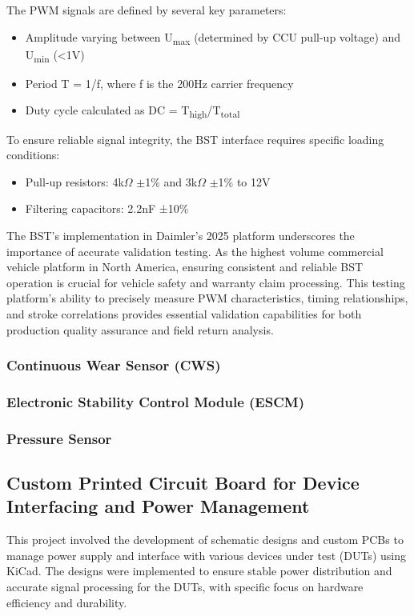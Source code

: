 \documentclass[12pt]{article}
\begin{document}
The PWM signals are defined by several key parameters: \begin{itemize} \item
    Amplitude varying between U\textsubscript{max} (determined by CCU pull-up
  voltage) and U\textsubscript{min} (<1V) \item Period T = 1/f, where f is the
    200Hz carrier frequency \item Duty cycle calculated as DC =
T\textsubscript{high}/T\textsubscript{total} \end{itemize}

To ensure reliable signal integrity, the BST interface requires specific
loading conditions: \begin{itemize} \item Pull-up resistors: 4k$\Omega$ $\pm$1\% and 3k$\Omega$
      $\pm$1\% to 12V \item Filtering capacitors: 2.2nF ±10\% \end{itemize}

      The BST's implementation in Daimler's 2025 platform underscores the
      importance of accurate validation testing. As the highest volume
      commercial vehicle platform in North America, ensuring consistent and
      reliable BST operation is crucial for vehicle safety and warranty claim
      processing. This testing platform's ability to precisely measure PWM
      characteristics, timing relationships, and stroke correlations provides
      essential validation capabilities for both production quality assurance
      and field return analysis.


\subsubsection{Continuous Wear Sensor (CWS)}

\subsubsection{Electronic Stability Control Module (ESCM)}

\subsubsection{Pressure Sensor}

\subsection{Custom Printed Circuit Board for Device Interfacing and Power Management}
This project involved the development of schematic designs and custom PCBs to
manage power supply and interface with various devices under test (DUTs) using
KiCad. The designs were implemented to ensure stable power distribution and
accurate signal processing for the DUTs, with specific focus on hardware
efficiency and durability.
\end{document}
